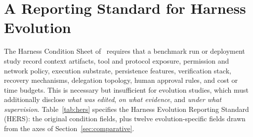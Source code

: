 \documentclass[conference]{IEEEtran}
\begin{document}
\section{A Reporting Standard for Harness Evolution}
\label{sec:hers}

The Harness Condition Sheet of~\cite{b7} requires that a benchmark run or deployment study record context artifacts, tool and protocol exposure, permission and network policy, execution substrate, persistence features, verification stack, recovery mechanisms, delegation topology, human approval rules, and cost or time budgets. This is necessary but insufficient for evolution studies, which must additionally disclose \emph{what was edited}, \emph{on what evidence}, and \emph{under what supervision}. Table~\ref{tab:hers} specifies the Harness Evolution Reporting Standard (HERS): the original condition fields, plus twelve evolution-specific fields drawn from the axes of Section~\ref{sec:comparative}.
\end{document}
